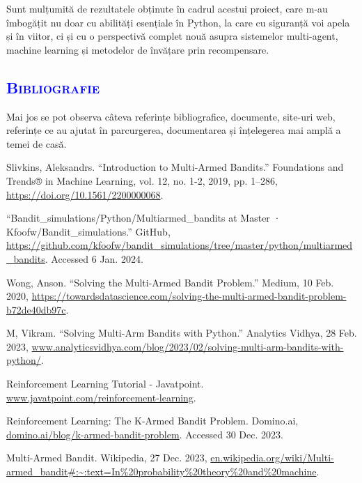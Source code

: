 \documentclass{article}
\begin{document}
Sunt mulțumită de rezultatele obținute în cadrul acestui proiect, care m-au îmbogățit nu doar cu abilități esențiale în Python, la care cu siguranță voi apela și în viitor, ci și cu o perspectivă complet nouă asupra sistemelor multi-agent, machine learning și metodelor de învățare prin recompensare.
\begin{center}
	\textcolor{blue}{\section{\bfseries\scshape\textcolor{blue}{ Bibliografie }}}
\end{center}
 Mai jos se pot observa câteva referințe bibliografice, documente, site-uri web, referințe ce au ajutat în parcurgerea, documentarea și înțelegerea mai amplă a temei de casă.
\begin{thebibliography}{8}
     Slivkins, Aleksandrs. “Introduction to Multi-Armed Bandits.” Foundations and Trends® in Machine Learning, vol. 12, no. 1-2, 2019, pp. 1–286,   {\small \url{https://doi.org/10.1561/2200000068}}. 
     
    “Bandit\_simulations/Python/Multiarmed\_bandits at Master · Kfoofw/Bandit\_simulations.” GitHub,  {\small \url{https://github.com/kfoofw/bandit_simulations/tree/master/python/multiarmed_bandits}}. Accessed 6 Jan. 2024.
    
    Wong, Anson. “Solving the Multi-Armed Bandit Problem.” Medium, 10 Feb. 2020, 
     {\small \url{https://towardsdatascience.com/solving-the-multi-armed-bandit-problem-b72de40db97c}}.
    
    M, Vikram. “Solving Multi-Arm Bandits with Python.” Analytics Vidhya, 28 Feb. 2023, 
     {\small \url{www.analyticsvidhya.com/blog/2023/02/solving-multi-arm-bandits-with-python/}}.
    
     Reinforcement Learning Tutorial - Javatpoint.  {\small \url{www.javatpoint.com/reinforcement-learning}}. 
 
    Reinforcement Learning: The K-Armed Bandit Problem. Domino.ai, {\small \url{domino.ai/blog/k-armed-bandit-problem}}. Accessed 30 Dec. 2023.

     Multi-Armed Bandit. Wikipedia, 27 Dec. 2023,  {\small  \url{en.wikipedia.org/wiki/Multi-armed_bandit#:~:text=In%20probability%20theory%20and%20machine}}.
   

\end{thebibliography}
\end{document}
